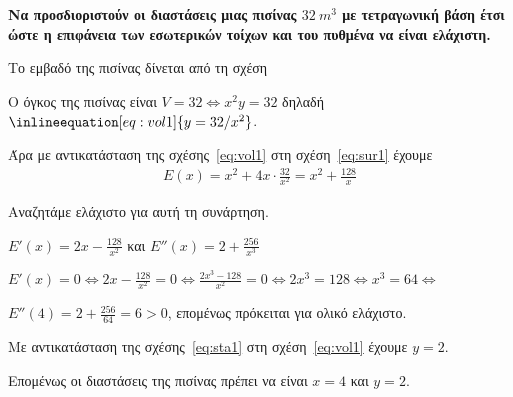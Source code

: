 \begin{exercise}
  {\bfseries \boldmath Να προσδιοριστούν οι διαστάσεις μιας πισίνας 
    $ \SI{32}{m^3} $ με τετραγωνική βάση έτσι ώστε η επιφάνεια των εσωτερικών 
  τοίχων και του πυθμένα να είναι ελάχιστη.}
\end{exercise}
\begin{solution}
\item {}

  Το εμβαδό της πισίνας δίνεται από τη σχέση

  Ο όγκος της πισίνας είναι $V = 32 \Leftrightarrow  x^{2}y = 32$
  δηλαδή $\inlineequation[eq:vol1]{y = {32}/{x^{2}}}$.

  Άρα με αντικατάσταση της σχέσης~\eqref{eq:vol1} στη
  σχέση~\eqref{eq:sur1} έχουμε
  \begin{align*}
    E(x) = x^{2} + 4x\cdot \frac{32}{x^{2}} = x^{2} + \frac{128}{x}
  \end{align*}

  Αναζητάμε ελάχιστο για αυτή τη συνάρτηση.
  \begin{myitemize}
    \item $ E'(x) = 2x - \frac{128}{x^{2}} $ και $ E''(x) = 2 + \frac{256}{x^{3}} $
    \item $ E'(x) = 0 \Leftrightarrow 2x - \frac{128}{x^{2}} = 0
      \Leftrightarrow \frac{2x^{3} - 128}{x^{2}} = 0 \Leftrightarrow
      2x^{3} = 128 \Leftrightarrow x^{3} = 64 \Leftrightarrow$
    \item $ E''(4) = 2 + \frac{256}{64} = 6 > 0 $, επομένως πρόκειται για
      ολικό ελάχιστο.
  \end{myitemize}
  Με αντικατάσταση της σχέσης~\eqref{eq:sta1} στη σχέση~\eqref{eq:vol1} έχουμε 
  $ y = 2 $.

  Επομένως οι διαστάσεις της πισίνας πρέπει να είναι $ x = 4 $ και $ y = 2 $.
\end{solution}

